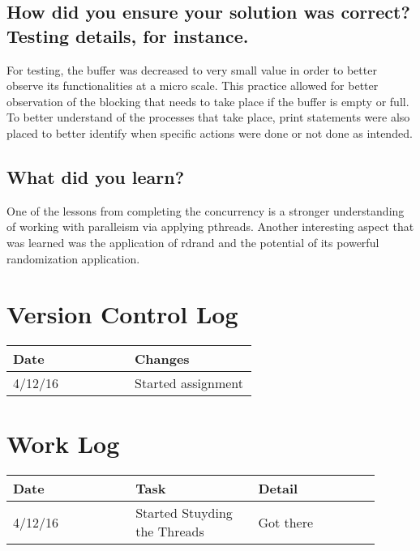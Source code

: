\documentclass[letterpaper,10pt,draftclsnofoot,onecolumn]{IEEEtran}
\begin{document}
\subsection{How did you ensure your solution was correct? Testing details, for instance.}
For testing, the buffer was decreased to very small value in order to better observe its functionalities at a micro scale. This practice allowed for 
better observation of the blocking that needs to take place if the buffer is empty or full. To better understand of the processes that take place,
print statements were also placed to better identify when specific actions were done or not done as intended.
\subsection{What did you learn?}
One of the lessons from completing the concurrency is a stronger understanding of working with paralleism via applying pthreads. Another 
interesting aspect that was learned was the application of rdrand and the potential of its powerful randomization application. 

\section{Version Control Log}
\begin{tabular}{|p{0.3\linewidth}|p{0.3\linewidth}|}
\hline
\textbf{Date}&\textbf{Changes}\\
\hline
4/12/16 & Started assignment\\
\hline

\end{tabular}

\section{Work Log}
\begin{tabular}{|p{0.3\linewidth}|p{0.3\linewidth}|p{0.3\linewidth}|}
\hline
\textbf{Date}&\textbf{Task}&\textbf{Detail}\\
\hline
4/12/16 & Started Stuyding the Threads & Got there\\
\hline

\end{tabular}
\end{document}
